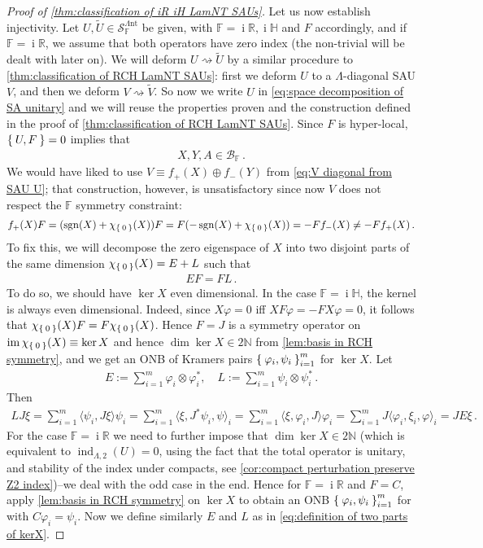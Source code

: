 \documentclass[a4paper,10pt]{article}
\numberwithin{equation}{section}
\theoremstyle{plain}
\theoremstyle{plain}
\theoremstyle{plain}
\theoremstyle{plain}
\theoremstyle{plain}
\theoremstyle{remark}
\theoremstyle{definition}
\theoremstyle{plain}
\newcommand{\ii}{\operatorname{i}}
\newcommand{\NN}{\mathbb{N}}
\newcommand{\RR}{\mathbb{R}}
\newcommand{\FF}{\mathbb{F}}
\newcommand{\calB}{\mathcal{B}}
\newcommand{\calSU}{\mathcal{S}}
\newcommand{\ti}[1]{\widetilde{#1}}
\newcommand{\LamNT}{\Lambda\mathrm{nt}}
\newcommand{\LamNTSAU}{\calSU^{\LamNT}}
\newcommand{\ip}[2]{\langle #1, #2 \rangle}
\newcommand{\vf}{\varphi}
\newcommand{\HH}{\mathbb{H}}
\newcommand{\sgn}{\operatorname{sgn}}
\newcommand{\findex}{\operatorname{ind}}
\newcommand{\im}{\operatorname{im}}
\newcommand{\eq}[1]{\begin{align*}#1\end{align*}}
\newcommand{\eql}[1]{\begin{align}#1\end{align}}
\begin{document}
\begin{proof}[Proof of \cref{thm:classification of iR iH LamNT SAUs}]
		Let us now establish injectivity. Let $U,\ti U\in\LamNTSAU_\FF$ be given, with $\FF=\ii\RR,\ii\HH$ and $F$ accordingly, and if $\FF=\ii\RR$, we assume that both operators have zero index (the non-trivial will be dealt with later on). We will deform $U\rightsquigarrow\ti U$ by a similar procedure to \cref{thm:classification of RCH LamNT SAUs}: first we deform $U$ to a $\Lambda$-diagonal SAU $V$, and then we deform $V\rightsquigarrow \ti V$. So now we write $U$ in \cref{eq:space decomposition of SA unitary} and we will reuse the properties proven and the construction defined in the proof of \cref{thm:classification of RCH LamNT SAUs}. Since $F$ is hyper-local, $\Set{U,F}=0$ implies that \eql{\label{eq:X Y A are iiR iiH symmetric}X,Y,A\in \calB_\FF\,.} 
		We would have liked to use $V\equiv f_+(X)\oplus f_-(Y)$ from \cref{eq:V diagonal from SAU U}; that construction, however, is unsatisfactory since now $V$ does not respect the $\FF$ symmetry constraint: \eq{f_+(X)F=(\sgn(X)+\chi_{\Set{0}}(X))F=F(-\sgn(X)+\chi_{\Set{0}}(X))=-F f_-(X)\neq -F f_+(X)\,.} 
		To fix this, we will decompose the zero eigenspace of $X$ into two disjoint parts of the same dimension $\chi_{\Set{0}}(X)=E + L$ such that \eql{E F=F L\,.\label{eq:symmetry intertwines two parts of kernels at zero}} 
		To do so, we should have $\ker X$ even dimensional. In the case $\FF=\ii\HH$, the kernel is always even dimensional. Indeed, since $X\vf=0$ iff $XF\vf=-FX\vf=0$, it follows that $\chi_{\Set{0}}(X)F=F\chi_{\Set{0}}(X)$. Hence $F=J$ is a symmetry operator on $\im\chi_{\Set{0}}(X)\equiv \ker X$ and hence $\dim\ker X\in 2\NN$ from \cref{lem:basis in RCH symmetry}, and we get an ONB of Kramers pairs $\Set{\vf_i,\psi_i}_{i=1}^m$ for $\ker X$. Let \eql{\label{eq:definition of two parts of kerX}E :=\sum_{i=1}^m \vf_i\otimes \vf_i^*,\quad L:=\sum_{i=1}^m\psi_i\otimes \psi_i^*\,.}
		Then \eq{LJ\xi=\sum_{i=1}^m \ip{\psi_i}{J\xi}\psi_i = \sum_{i=1}^m \ip{\xi,J^*\psi_i}\psi_i = \sum_{i=1}^m \ip{\xi,\vf_i}J\vf_i= \sum_{i=1}^m J \ip{\vf_i,\xi_i}\vf_i=J E\xi\,.}
		For the case $\FF=\ii\RR$ we need to further impose that $\dim\ker X\in 2\NN$ (which is equivalent to $\findex_{\Lambda,2}(U)=0$, using the fact that the total operator is unitary, and stability of the index under compacts, see \cref{cor:compact perturbation preserve Z2 index})--we deal with the odd case in the end. Hence for $\FF=\ii\RR$ and $F=C$, apply \cref{lem:basis in RCH symmetry} on $\ker X$ to obtain an ONB $\Set{\vf_i,\psi_i}_{i=1}^m$ for  with $C\vf_i=\psi_i$. Now we define similarly $E$ and $L$ as in \cref{eq:definition of two parts of kerX}.
		

\end{proof}
\end{document}
